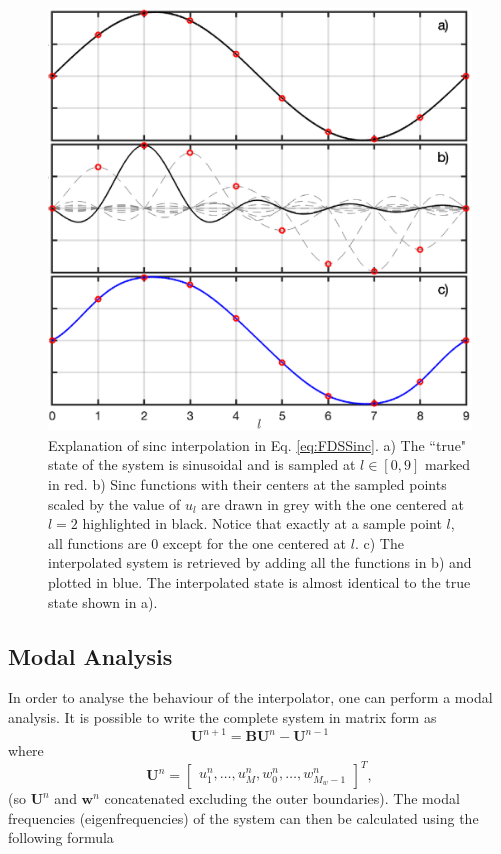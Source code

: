 \documentclass[dvipsnames]{article}
\def\U{\mathbf{U}}
\begin{document}
\begin{figure}[h]
\centerline{\includegraphics[width=0.6\columnwidth]{sincExplanation.eps} }
\caption{\label{fig:sincExp}{Explanation of sinc interpolation in Eq. \eqref{eq:FDSSinc}. a) The ``true" state of the system is sinusoidal and is sampled at $l \in [0, 9]$ marked in red. b) Sinc functions with their centers at the sampled points scaled by the value of $u_l$ are drawn in grey with the one centered at $l = 2$ highlighted in black. Notice that exactly at a sample point $l$, all functions are 0 except for the one centered at $l$. c) The interpolated system is retrieved by adding all the functions in b) and plotted in blue. The interpolated state is almost identical to the true state shown in a).}}
\end{figure}



\subsection{Modal Analysis}\label{sec:modal}
In order to analyse the behaviour of the interpolator, one can perform a modal analysis. It is possible to write the complete system in matrix form as
\begin{equation}
    \U^{n+1} = \mathbf{B}\U^n - \U^{n-1}
\end{equation}
where \begin{equation}\label{eq:uVecDef}
\U^n = \begin{bmatrix}
u^n_1, \hdots, u^n_M, w_0^n, \hdots, w_{M_w-1}  ^n
\end{bmatrix}^T,
\end{equation}
(so $\U^n$ and $\mathbf{w}^n$ concatenated excluding the outer boundaries).  The modal frequencies (eigenfrequencies) of the system can then be calculated using the following formula \cite[p. 174]{Bilbao2009}
\end{document}
